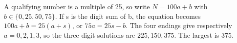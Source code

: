A qualifying number is a multiple of 25, so write $N=100a+b$ with $b\in\{0,25,50,75\}$. If s is the digit sum of b, the equation becomes $100a+b=25(a+s)$, or $75a=25s-b$. The four endings give respectively $a=0,2,1,3$, so the three-digit solutions are $225,150,375$. The largest is $\boxed{375}$.
